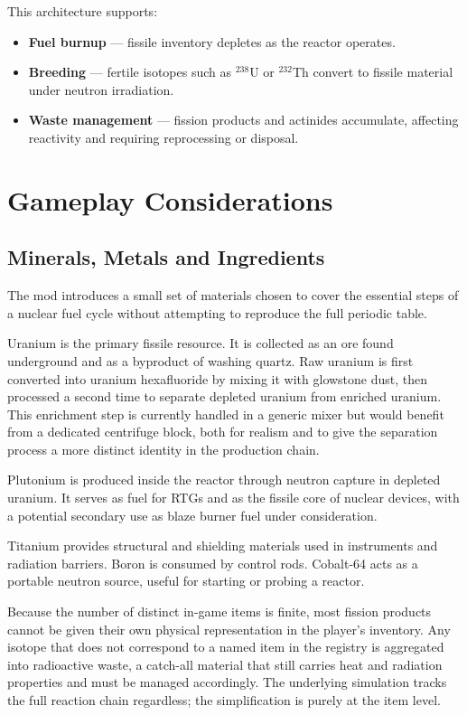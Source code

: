 \documentclass{report}
\begin{document}
This architecture supports:
\begin{itemize}
    \item \textbf{Fuel burnup} — fissile inventory depletes as the reactor operates.
    \item \textbf{Breeding} — fertile isotopes such as $^{238}$U or $^{232}$Th convert
          to fissile material under neutron irradiation.
    \item \textbf{Waste management} — fission products and actinides accumulate,
          affecting reactivity and requiring reprocessing or disposal.
\end{itemize}


\chapter{Gameplay Considerations}

\section{Minerals, Metals and Ingredients}

The mod introduces a small set of materials chosen to cover the essential steps of a
nuclear fuel cycle without attempting to reproduce the full periodic table.

Uranium is the primary fissile resource. It is collected as an ore found underground
and as a byproduct of washing quartz. Raw uranium is first converted into uranium
hexafluoride by mixing it with glowstone dust, then processed a second time to separate
depleted uranium from enriched uranium. This enrichment step is currently handled in a
generic mixer but would benefit from a dedicated centrifuge block, both for realism and
to give the separation process a more distinct identity in the production chain.

Plutonium is produced inside the reactor through neutron capture in depleted uranium.
It serves as fuel for RTGs and as the fissile core of nuclear devices, with a potential
secondary use as blaze burner fuel under consideration.

Titanium provides structural and shielding materials used in instruments and radiation
barriers. Boron is consumed by control rods. Cobalt-64 acts as a portable neutron
source, useful for starting or probing a reactor.

Because the number of distinct in-game items is finite, most fission products cannot
be given their own physical representation in the player's inventory. Any isotope that
does not correspond to a named item in the registry is aggregated into radioactive waste,
a catch-all material that still carries heat and radiation properties and must be managed
accordingly. The underlying simulation tracks the full reaction chain regardless; the
simplification is purely at the item level.
\end{document}
